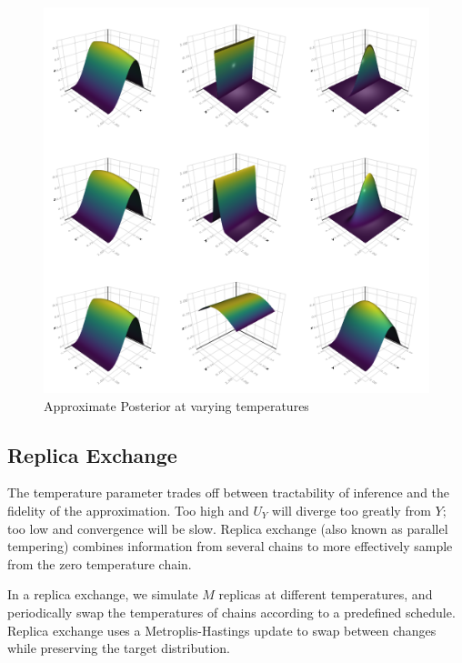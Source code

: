 \begin{figure}\label{temppost}
\includegraphics[width=\linewidth]{approxpost.png}
\caption{Approximate Posterior at varying temperatures}
\end{figure}



\subsection{Replica Exchange}

The temperature parameter trades off between tractability of inference and the fidelity of the approximation.
Too high and $U_Y$ will diverge too greatly from $Y$; too low and convergence will be slow.
Replica exchange (also known as parallel tempering) \citep{swendsen1986replica} combines information from several chains to more  effectively sample from the zero temperature chain.

In a replica exchange, we simulate $M$ replicas at different temperatures, and periodically swap the temperatures of chains according to a predefined schedule.
Replica exchange uses a Metroplis-Hastings update to swap between changes while preserving the target distribution.

